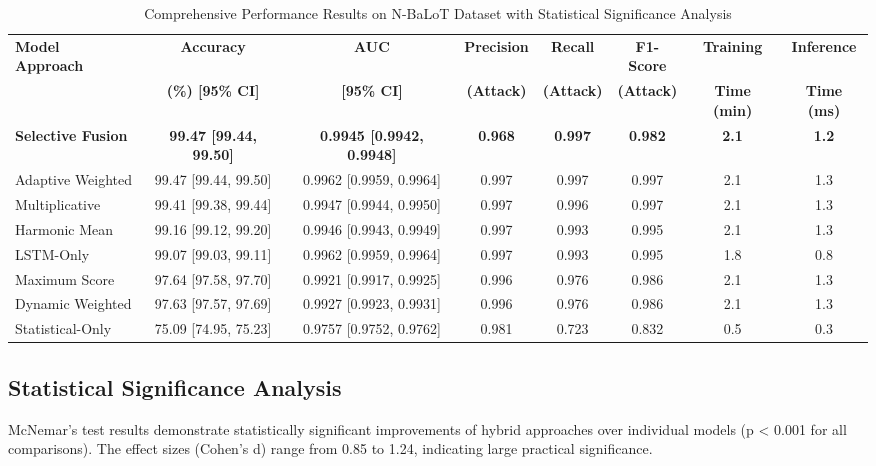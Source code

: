 \documentclass[conference]{IEEEtran}
\begin{document}
\begin{table*}[!t]
\centering
\caption{Comprehensive Performance Results on N-BaLoT Dataset with Statistical Significance Analysis}
\label{tab:comprehensive_results}
\begin{tabular}{@{}lccccccc@{}}
\toprule
\multirow{2}{*}{\textbf{Model Approach}} & \textbf{Accuracy} & \textbf{AUC} & \textbf{Precision} & \textbf{Recall} & \textbf{F1-Score} & \textbf{Training} & \textbf{Inference} \\
& \textbf{(\%) [95\% CI]} & \textbf{[95\% CI]} & \textbf{(Attack)} & \textbf{(Attack)} & \textbf{(Attack)} & \textbf{Time (min)} & \textbf{Time (ms)} \\
\midrule
\textbf{Selective Fusion} & \textbf{99.47 [99.44, 99.50]} & \textbf{0.9945 [0.9942, 0.9948]} & \textbf{0.968} & \textbf{0.997} & \textbf{0.982} & \textbf{2.1} & \textbf{1.2} \\
Adaptive Weighted & 99.47 [99.44, 99.50] & 0.9962 [0.9959, 0.9964] & 0.997 & 0.997 & 0.997 & 2.1 & 1.3 \\
Multiplicative & 99.41 [99.38, 99.44] & 0.9947 [0.9944, 0.9950] & 0.997 & 0.996 & 0.997 & 2.1 & 1.3 \\
Harmonic Mean & 99.16 [99.12, 99.20] & 0.9946 [0.9943, 0.9949] & 0.997 & 0.993 & 0.995 & 2.1 & 1.3 \\
LSTM-Only & 99.07 [99.03, 99.11] & 0.9962 [0.9959, 0.9964] & 0.997 & 0.993 & 0.995 & 1.8 & 0.8 \\
Maximum Score & 97.64 [97.58, 97.70] & 0.9921 [0.9917, 0.9925] & 0.996 & 0.976 & 0.986 & 2.1 & 1.3 \\
Dynamic Weighted & 97.63 [97.57, 97.69] & 0.9927 [0.9923, 0.9931] & 0.996 & 0.976 & 0.986 & 2.1 & 1.3 \\
Statistical-Only & 75.09 [74.95, 75.23] & 0.9757 [0.9752, 0.9762] & 0.981 & 0.723 & 0.832 & 0.5 & 0.3 \\
\bottomrule
\end{tabular}
\end{table*}

\subsection{Statistical Significance Analysis}

McNemar's test results demonstrate statistically significant improvements of hybrid approaches over individual models (p < 0.001 for all comparisons). The effect sizes (Cohen's d) range from 0.85 to 1.24, indicating large practical significance.
\end{document}
